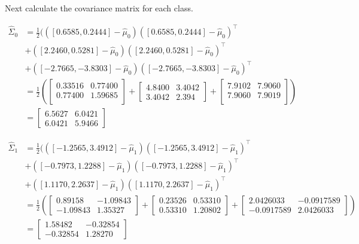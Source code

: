 \documentclass{jhwhw}
\newcommand{\Hat}[1]{\expandafter\hat#1}
\begin{document}
    Next calculate the covariance matrix for each class.

    \begin{align*}
	\Hat{\Sigma}_0 &= \frac{1}{2}(
	    ([0.6585, 0.2444] - \Hat{\mu}_0)([0.6585, 0.2444] - \Hat{\mu}_0)^\intercal &\\
	    &+ ([2.2460, 0.5281] - \Hat{\mu}_0)([2.2460, 0.5281] - \Hat{\mu}_0)^\intercal &\\
	    &+ ([-2.7665, -3.8303] - \Hat{\mu}_0)([-2.7665, -3.8303] - \Hat{\mu}_0)^\intercal &\\
	    &= 
		\frac{1}{2} (
		    \begin{bmatrix}
			0.33516 & 0.77400 \\
			0.77400 & 1.59685 \\
		    \end{bmatrix}
		    +
		    \begin{bmatrix}
			4.8400 & 3.4042 \\
			3.4042 & 2.394
		    \end{bmatrix}
		    +
		    \begin{bmatrix}
			7.9102 & 7.9060 \\
			7.9060 & 7.9019 \\
		    \end{bmatrix}
		) &\\
	    &=
		\begin{bmatrix}
		    6.5627 & 6.0421 \\
		    6.0421 & 5.9466
		\end{bmatrix}
    \end{align*}

    \begin{align*}
	\Hat{\Sigma}_1 &= \frac{1}{2}(
	    ([-1.2565, 3.4912] - \Hat{\mu}_1)([-1.2565, 3.4912] - \Hat{\mu}_1)^\intercal &\\
	    &+ ([-0.7973, 1.2288] - \Hat{\mu}_1)([-0.7973, 1.2288] - \Hat{\mu}_1)^\intercal &\\
	    &+ ([1.1170, 2.2637] - \Hat{\mu}_1)([1.1170, 2.2637] - \Hat{\mu}_1)^\intercal &\\
	    &= 
		\frac{1}{2} (
		    \begin{bmatrix}
			0.89158 & -1.09843 \\
			-1.09843 & 1.35327
		    \end{bmatrix}
		    +
		    \begin{bmatrix}
			0.23526 & 0.53310 \\
			0.53310 & 1.20802 
		    \end{bmatrix}
		    +
		    \begin{bmatrix}
			2.0426033 & -0.0917589 \\
			-0.0917589 & 2.0426033
		    \end{bmatrix}
		) &\\
	    &=
		\begin{bmatrix}
		    1.58482 & -0.32854 \\
		    -0.32854 & 1.28270 
		\end{bmatrix}
    \end{align*}
\end{document}
